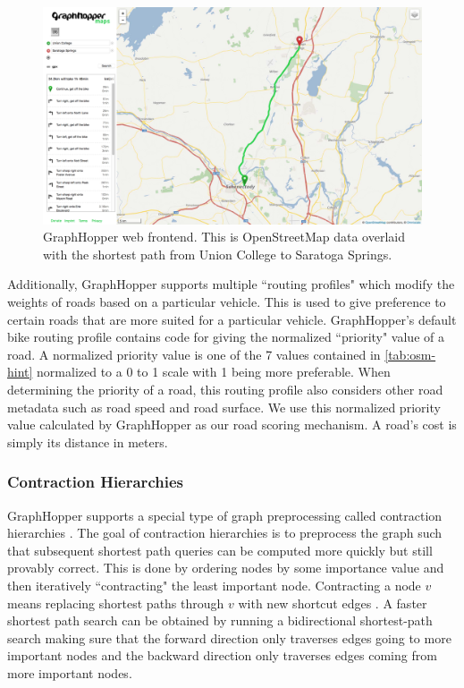 \documentclass[honors]{union-cs-thesis}
\begin{document}
\begin{figure}
    \begin{center}
        \includegraphics[width=\textwidth]{figs/graphhopper}
    \end{center}
    \caption{GraphHopper web frontend. This is OpenStreetMap data overlaid with the shortest path from Union College to Saratoga Springs.}
    \label{tab:graphhopper-frontend}
\end{figure}

Additionally, GraphHopper supports multiple ``routing profiles" which modify the weights of roads based on a particular vehicle. This is used to give preference to certain roads that are more suited for a particular vehicle. GraphHopper's default bike routing profile contains code for giving the normalized ``priority" value of a road. A normalized priority value is one of the 7 values contained in \cref{tab:osm-hint} normalized to a 0 to 1 scale with 1 being more preferable. When determining the priority of a road, this routing profile also considers other road metadata such as road speed and road surface. We use this normalized priority value calculated by GraphHopper as our road scoring mechanism. A road's cost is simply its distance in meters.


\subsubsection{Contraction Hierarchies}
GraphHopper supports a special type of graph preprocessing called contraction hierarchies \cite{graphhopper}. The goal of contraction hierarchies is to preprocess the graph such that subsequent shortest path queries can be computed more quickly but still provably correct. This is done by ordering nodes by some importance value and then iteratively ``contracting" the least important node. Contracting a node $v$ means replacing shortest paths through $v$ with new shortcut edges \cite{geisberger2008contraction}. A faster shortest path search can be obtained by running a bidirectional shortest-path search making sure that the forward direction only traverses edges going to more important nodes and the backward direction only traverses edges coming from more important nodes.
\end{document}
